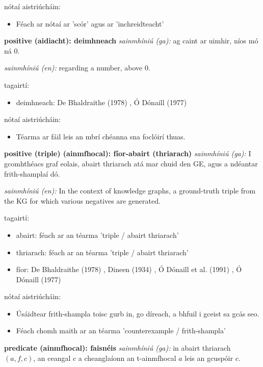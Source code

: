 \documentclass{article}
\begin{document}
nótaí aistriúcháin:
\begin{itemize}
	\item Féach ar nótaí ar 'scór' agus ar 'inchreidteacht'
\end{itemize}


\textbf{positive (aidiacht): deimhneach}
\textit{sainmhíniú (ga):} ag caint ar uimhir, níos mó ná 0.

\textit{sainmhíniú (en):} regarding a number, above 0.

tagairtí:
\begin{itemize}
	\item deimhneach: De Bhaldraithe (1978) \cite{de-bhaldraithe}, Ó Dónaill (1977) \cite{odonaill}
\end{itemize}

nótaí aistriúcháin:
\begin{itemize}
	\item Téarma ar fáil leis an mbrí chéanna sna foclóirí thuas.
\end{itemize}


\textbf{positive (triple) (ainmfhocal): fíor-abairt (thriarach)}
\textit{sainmhíniú (ga):} I gcomhthéacs graf eolais, abairt thriarach atá mar chuid den GE, agus a ndéantar frith-shamplaí dó.

\textit{sainmhíniú (en):} In the context of knowledge graphs, a ground-truth triple from the KG for which various negatives are generated.

tagairtí:
\begin{itemize}
	\item abairt: féach ar an téarma 'triple / abairt thriarach'
	\item thriarach: féach ar an téarma 'triple / abairt thriarach'
	\item fíor: De Bhaldraithe (1978) \cite{de-bhaldraithe}, Dineen (1934) \cite{dineen}, Ó Dónaill et al. (1991) \cite{focloir-beag}, Ó Dónaill (1977) \cite{odonaill}
\end{itemize}

nótaí aistriúcháin:
\begin{itemize}
	\item Úsáidtear frith-shampla toisc gurb in, go díreach, a bhfuil i gceist sa gcás seo.
	\item Féach chomh maith ar an téarma 'counterexample / frith-shampla'
\end{itemize}


\textbf{predicate (ainmfhocal): faisnéis}
\textit{sainmhíniú (ga):} in abairt thriarach $(a,f,c)$, an ceangal $c$ a cheanglaíonn an t-ainmfhocal $a$ leis an gcuspóir $c$.
\end{document}
